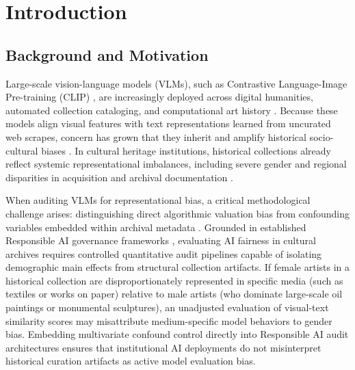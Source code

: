 \documentclass[pdflatex,sn-mathphys-num]{sn-jnl}%
\theoremstyle{thmstyleone}%
\theoremstyle{thmstyletwo}%
\theoremstyle{thmstylethree}%
\begin{document}

\maketitle

\section{Introduction}
\label{sec:introduction}

\subsection{Background and Motivation}
Large-scale vision-language models (VLMs), such as Contrastive Language-Image Pre-training (CLIP) \cite{radford2021learning}, are increasingly deployed across digital humanities, automated collection cataloging, and computational art history \cite{fiorucci2020machine, garcia2020bias}. Because these models align visual features with text representations learned from uncurated web scrapes, concern has grown that they inherit and amplify historical socio-cultural biases \cite{birhane2021multimodal, wolfe2022evidence, bender2021stochastic}. In cultural heritage institutions, historical collections already reflect systemic representational imbalances, including severe gender and regional disparities in acquisition and archival documentation \cite{topaz2019diversity, meier2021gender, carlson2022museum, bailey2020gender, nochlin1971why, pollock1988vision}.

When auditing VLMs for representational bias, a critical methodological challenge arises: distinguishing direct algorithmic valuation bias from confounding variables embedded within archival metadata \cite{hall2023auditing, buolamwini2018gender, noorthuis2020bias}. Grounded in established Responsible AI governance frameworks \cite{dignum2019responsible, stahl2021responsible, jobin2019global}, evaluating AI fairness in cultural archives requires controlled quantitative audit pipelines capable of isolating demographic main effects from structural collection artifacts. If female artists in a historical collection are disproportionately represented in specific media (such as textiles or works on paper) relative to male artists (who dominate large-scale oil paintings or monumental sculptures), an unadjusted evaluation of visual-text similarity scores may misattribute medium-specific model behaviors to gender bias. Embedding multivariate confound control directly into Responsible AI audit architectures \cite{mitchell2019model, stahl2021responsible} ensures that institutional AI deployments do not misinterpret historical curation artifacts as active model evaluation bias.
\end{document}
